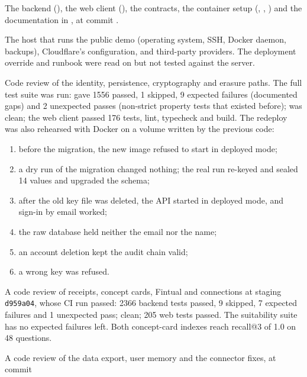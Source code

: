 \documentclass[11pt,a4paper]{article}
\begin{document}
\begin{description}[style=nextline,leftmargin=1.2em]
  \item[In scope] The backend (), the web client (), the contracts, the
    container setup (, , ) and the
    documentation in , at commit \texttt{\nlCommit}.
  \item[Out of scope] The host that runs the public demo (operating system, SSH, Docker daemon, backups), Cloudflare's
    configuration, and third-party providers. The deployment override and runbook were read on
     but not tested against the server.
  \item[Method] Code review of the identity, persistence, cryptography and erasure paths. The full test suite was run:
     gave 1556 passed, 1 skipped, 9 expected failures (documented gaps) and 2 unexpected
    passes (non-strict property tests that existed before);  was clean; the web client passed 176 tests,
    lint, typecheck and build. The redeploy was also rehearsed with Docker on a volume written by the previous code:
    \begin{enumerate}
      \item before the migration, the new image refused to start in deployed mode;
      \item a dry run of the migration changed nothing; the real run re-keyed and sealed 14 values and upgraded the schema;
      \item after the old key file was deleted, the API started in deployed mode, and sign-in by email worked;
      \item the raw database held neither the email nor the name;
      \item an account deletion kept the audit chain valid;
      \item a wrong key was refused.
    \end{enumerate}
  \item[Update 1.1] A code review of receipts, concept cards, Fintual and connections at staging \texttt{d959a04},
    whose CI run passed: 2366 backend tests passed, 9 skipped, 7 expected failures and 1 unexpected pass; 
    clean; 205 web tests passed. The suitability suite has no expected failures left. Both concept-card indexes reach
    recall@3 of 1.0 on 48 questions.
  \item[Update 1.2] A code review of the data export, user memory and the connector fixes, at commit

\end{description}
\end{document}
